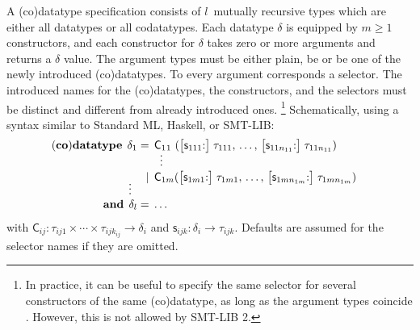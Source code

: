 \documentclass[a4paper,oribibl,envcountsame,draft]{llncs}
\newcommand\keyw[1]{\textbf{#1}}
\newcommand\const[1]{\textsf{#1}}
\begin{document}
A (co)datatype specification consists of $l$~mutually recursive types which are
either all datatypes or all codatatypes. Each datatype $\delta$ is equipped by
$m \ge 1$ constructors, and each constructor for $\delta$ takes zero or more
arguments and returns a $\delta$ value. The argument types must be either
plain, be or be one of the newly introduced (co)datatypes. To every
argument corresponds a selector. The introduced names for the (co)datatypes, the
constructors, and the selectors must be distinct and different from already
introduced ones.%
\footnote{In practice, it can be useful to specify the same selector
for several constructors of the same (co)datatype,
as long as the argument types coincide \cite[Section~3]{blanchette-et-al-2014-codata}.
However, this is not allowed by SMT-LIB 2.}
Schematically, using a syntax similar to Standard ML, Haskell,
or SMT-LIB:
%
\[
\begin{aligned}[t]
(\keyw{co})\keyw{datatype}\;\,
  \delta_1 & {}=\, \const{C}_{1}\rlap{${}_{1}$}\phantom{{}_{m}}(\bigl[\const{s}_{111}{:}\bigr]\; \tau_{111}, \,\ldots,\, \bigl[\const{s}_{11n_{11}}{:}\bigr]\; \tau_{11n_{11}}) & \\
           & {}\;\phantom{=\,}\;{} \smash{\,\,\,\vdots} \\[-\jot] %
           & {}\;\phantom{=\,}\llap{\ensuremath{\,\mid\,}}\; \const{C}_{1m}(\bigl[\const{s}_{1m1}{:}\bigr]\; \tau_{1m1}, \,\ldots,\, \big[\const{s}_{1mn_{1m}}{:}\big]\; \tau_{1mn_{1m}}) \\[-1\jot]
   \smash{\vdots\,\,\,} \\[-1\jot]
  \keyw{and}\; \,\delta_l & =\, \ldots
\end{aligned}
\]
%
with
$\const{C}_{ij} : \tau_{ij1}\times\cdots\times\tau_{ijk_{ij}} \to \delta_i$
and $\const{s}_{ijk} : \delta_i \to \tau_{ijk}$. Defaults are assumed for
the selector names if they are omitted.
\end{document}

